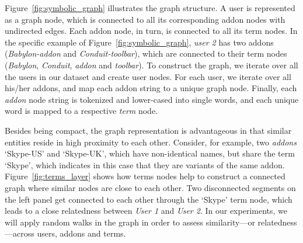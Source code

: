 \documentclass[ijoc,nonblindrev]{informs3} %
\numberwithin{equation}{subsection}
\begin{document}
Figure~\ref{fig:symbolic_graph} illustrates the graph structure. A user is represented as a graph node, which is connected to all its corresponding addon nodes with undirected edges. Each addon node, in turn, is connected to all its term nodes. In the specific example of Figure~\ref{fig:symbolic_graph}, {\it user 2} has two addons ({\it Babylon-addon} and {\it Conduit-toolbar}), which are connected to their term nodes ({\it Babylon}, {\it Conduit}, {\it addon} and {\it toolbar}).
To construct the graph, we iterate over all the users in our dataset and create user nodes. For each user, we iterate over all his/her addons, and map each addon string to a unique graph node. Finally, each {\it addon} node string is tokenized and lower-cased into single words, and each unique word is mapped to a respective {\it term} node. 

Besides being compact, the graph representation is advantageous in that similar entities reside in high proximity to each other. Consider, for example, two {\it addons} `Skype-US' and `Skype-UK', which have non-identical names, but share the term `Skype', which indicates in this case that they are variants of the same addon. Figure~\ref{fig:terms_layer} shows how terms nodes help to construct a connected graph where similar nodes are close to each other. Two disconnected segments on the left panel get connected to each other through the `Skype' term node, which leads to a close relatedness between {\it User 1} and {\it User 2}. In our experiments, we will apply random walks in the graph in order to assess similarity---or relatedness---across users, addons and terms.  
\end{document}
